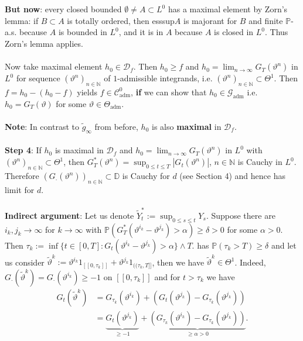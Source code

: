\documentclass[12pt,a4paper, twoside]{article}
\theoremstyle{definition}
\newcommand{\PP}{\mathbb{P}} %
\begin{document}
\\\\
\textbf{But now}: every closed bounded $\emptyset \neq A \subset L^0$ has a maximal element by Zorn's lemma: if $B \subset A$ is totally ordered, then esssup$A$ is majorant for $B$ and finite $\PP$-a.s. because $A$ is bounded in $L^0$, and it is in $A$ because $A$ is closed in $L^0$. Thus Zorn's lemma applies. 
\\\\
Now take maximal element $h_0 \in \mathcal{D}_f$. Then $h_0 \geq f$ and $h_0 = \lim_{n \to \infty} G_T( \vartheta^n)$ in $L^0$ for sequence $( \vartheta^n)_{n \in \mathbb{N}}$ of $1$-admissible integrands, i.e. $( \vartheta^n)_{n \in \mathbb{N}} \subset \Theta^1$. Then $f=h_0-(h_0-f)$ yields $f \in \mathcal{C}_\text{adm}^0$, \textbf{if} we can show that $h_0 \in \mathcal{G}_\text{adm}$ i.e. $h_0  = G_T( \vartheta)$ for some $\vartheta \in \Theta_\text{adm}$.
\\\\
\textbf{Note}: In contrast to $\widetilde{g}_\infty$ from before, $h_0$ is also \textbf{maximal} in $\mathcal{D}_f$. \\
\\
\textbf{Step 4}: If $h_0$ is maximal in $\mathcal{D}_f$ and $h_0 = \lim_{n \to \infty} G_T( \vartheta^n)$ in $L^0$ with $( \vartheta^n)_{n \in \mathbb{N}} \subset \Theta^1$, then $G_T^*( \vartheta^n) = \sup_{0 \leq t \leq T} | G_t( \vartheta^n)|$, $n \in \mathbb{N}$ is Cauchy in $L^0$. Therefore $( G_\cdot ( \vartheta^n))_{n \in \mathbb{N}} \subset \mathbb{D}$ is Cauchy for $d$ (see Section 4) and hence has limit for $d$. \\
\\
\textbf{Indirect argument}: Let us denote $\widetilde{Y}_t^*:= \sup_{0 \leq s \leq t} Y_s$. Suppose there are $i_k, j_k \to \infty$ for $k \to \infty$ with $\PP(G_T^*( \vartheta^{i_k}- \vartheta^{j_k}) > \alpha) \geq \delta >0$ for some $\alpha >0$. Then $\tau_k := \inf \{ t \in [0,T] : G_t( \vartheta^{i_k}- \vartheta^{j_k}) > \alpha  \} \wedge T$. has $\PP( \tau_k > T) \geq \delta$ and let us consider  $\widetilde{\vartheta}^k:= \vartheta^{i_k} 1_{[ \![ 0, \tau_k ]\!]} + \vartheta^{j_k} 1_{(\!( \tau_k, T]\!]}$, then we have $\widetilde{\vartheta}^k \in \Theta^1$. Indeed, $G_\cdot ( \widetilde{\vartheta}^k) = G_\cdot ( \vartheta^{i_k}) \geq -1$ on $[\![0, \tau_k ]\!]$ and for $t > \tau_k$ we have  
\begin{align*}
G_t( \widetilde{\vartheta}^k) &= G_{\tau_k} ( \vartheta^{i_k}) + ( G_t( \vartheta^{j_k}) - G_{\tau_k} ( \vartheta^{j_k})) \\
&= \underbrace{G_t( \vartheta^{j_k})}_{ \geq -1} + \underbrace{( G_{\tau_k} ( \vartheta^{i_k})- G_{\tau_k} ( \vartheta^{j_k}))}_{ \geq \alpha >0}.
\end{align*}
\end{document}
